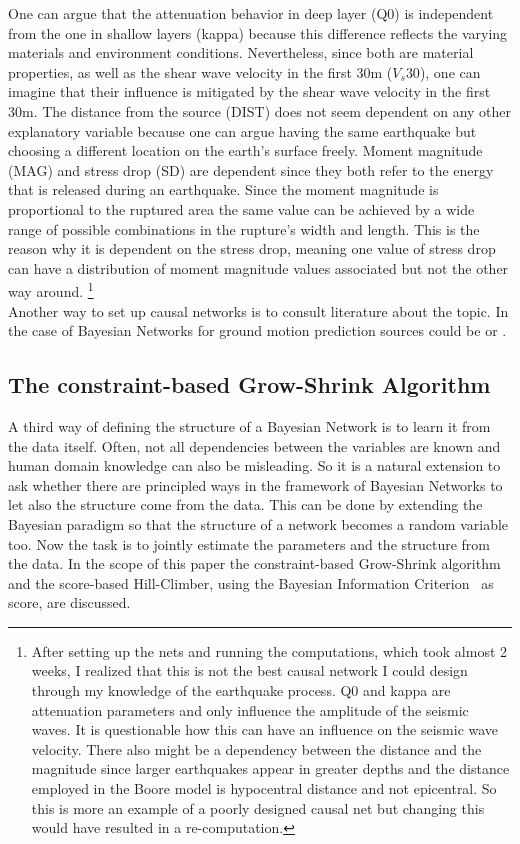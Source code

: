 One can argue that the attenuation behavior in deep layer (Q0) is independent from the one in shallow layers (kappa) because this difference reflects the varying materials and environment conditions. Nevertheless, since both are material properties, as well as the shear wave velocity in the first 30m ($V_s30$), one can imagine that their influence is mitigated by the shear wave velocity in the first 30m. The distance from the source (DIST) does not seem dependent on any other explanatory variable because one can argue having the same earthquake but choosing a different location on the earth's surface freely. Moment magnitude (MAG) and stress drop (SD) are dependent since they both refer to the energy that is released during an earthquake. Since the moment magnitude is proportional to the ruptured area the same value can be achieved by a wide range of possible combinations in the rupture's width and length. This is the reason why it is dependent on the stress drop, meaning one value of stress drop can have a distribution of moment magnitude values associated but not the other way around.
\footnote{After setting up the nets and running the computations, which took almost 2 weeks, I realized that this is not the best causal network I could design through my knowledge of the earthquake process. Q0 and kappa are attenuation parameters and only influence the amplitude of the seismic waves. It is questionable how this can have an influence on the seismic wave velocity. There also might be a dependency between the distance and the magnitude since larger earthquakes appear in greater depths and the distance employed in the Boore model is hypocentral distance and not epicentral. So this is more an example of a poorly designed causal net but changing this would have resulted in a re-computation.}\\
Another way to set up causal networks is to consult literature about the topic. In the case of Bayesian Networks for ground motion prediction sources could be \cite{kuehn2010} or \cite{Vogel2014}.\\

\subsection{The constraint-based Grow-Shrink Algorithm}

A third way of defining the structure of a Bayesian Network is to learn it from the data itself. Often, not all dependencies between the variables are known and human domain knowledge can also be misleading. So it is a natural extension to ask whether there are principled ways in the framework of Bayesian Networks to let also the structure come from the data. This can be done by extending the Bayesian paradigm so that the structure of a network becomes a random variable too. Now the task is to jointly estimate the parameters and the structure from the data. In the scope of this paper the constraint-based Grow-Shrink algorithm~\citep{margaritis2003} and the score-based Hill-Climber, using the Bayesian Information Criterion~\citep{schwarz} as score, are discussed.\\

